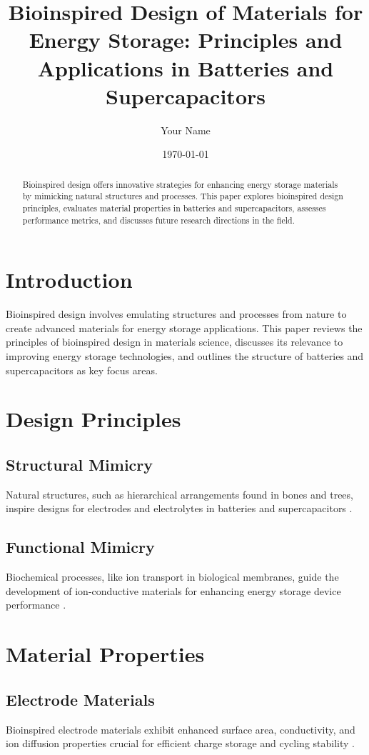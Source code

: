 \documentclass[12pt]{article}
\title{Bioinspired Design of Materials for Energy Storage: Principles and Applications in Batteries and Supercapacitors}
\author{Your Name}
\date{\today}
\begin{document}
\maketitle

\begin{abstract}
Bioinspired design offers innovative strategies for enhancing energy storage materials by mimicking natural structures and processes. This paper explores bioinspired design principles, evaluates material properties in batteries and supercapacitors, assesses performance metrics, and discusses future research directions in the field.
\end{abstract}

\section{Introduction}
Bioinspired design involves emulating structures and processes from nature to create advanced materials for energy storage applications. This paper reviews the principles of bioinspired design in materials science, discusses its relevance to improving energy storage technologies, and outlines the structure of batteries and supercapacitors as key focus areas.

\section{Design Principles}
\subsection{Structural Mimicry}
Natural structures, such as hierarchical arrangements found in bones and trees, inspire designs for electrodes and electrolytes in batteries and supercapacitors \citep{lee2012bioinspired, liu2019bioinspired}.

\subsection{Functional Mimicry}
Biochemical processes, like ion transport in biological membranes, guide the development of ion-conductive materials for enhancing energy storage device performance \citep{luo2016bioinspired, jiang2020bioinspired}.

\section{Material Properties}
\subsection{Electrode Materials}
Bioinspired electrode materials exhibit enhanced surface area, conductivity, and ion diffusion properties crucial for efficient charge storage and cycling stability \citep{li2017bioinspired, wang2018bioinspired}.
\end{document}

